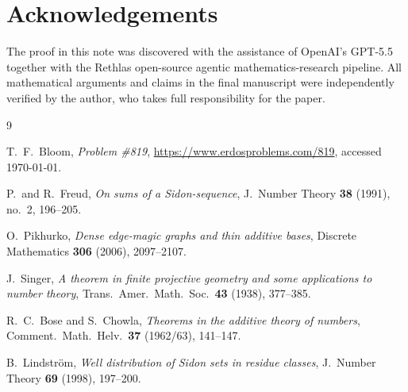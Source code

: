 \documentclass[11pt]{amsart}
\begin{document}
\section*{Acknowledgements}
The proof in this note was discovered with the assistance of OpenAI's
GPT-5.5 together with the Rethlas open-source agentic
mathematics-research pipeline. All mathematical arguments and claims
in the final manuscript were independently verified by the author, who
takes full responsibility for the paper.

\begin{thebibliography}{9}

T.~F.~Bloom,
\emph{\Erdos Problem \#819},
\url{https://www.erdosproblems.com/819},
accessed \today.

P.~\Erdos and R.~Freud,
\emph{On sums of a Sidon-sequence},
J.\ Number Theory \textbf{38} (1991), no.~2, 196--205.

O.~Pikhurko,
\emph{Dense edge-magic graphs and thin additive bases},
Discrete Mathematics \textbf{306} (2006), 2097--2107.

J.~Singer,
\emph{A theorem in finite projective geometry and some applications to number theory},
Trans.\ Amer.\ Math.\ Soc.\ \textbf{43} (1938), 377--385.

R.~C.~Bose and S.~Chowla,
\emph{Theorems in the additive theory of numbers},
Comment.\ Math.\ Helv.\ \textbf{37} (1962/63), 141--147.

B.~Lindstr\"om,
\emph{Well distribution of Sidon sets in residue classes},
J.\ Number Theory \textbf{69} (1998), 197--200.

\end{thebibliography}
\end{document}
